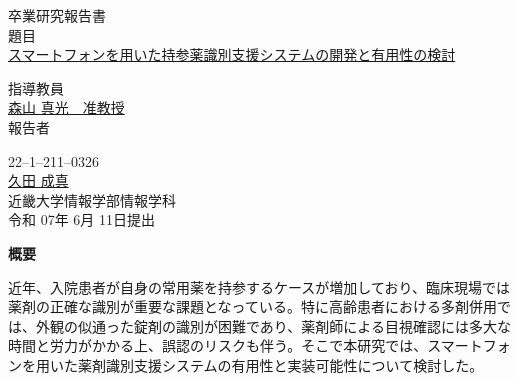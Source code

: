 \documentclass[12pt]{article}
\begin{document}
\pagestyle{empty}

\begin{center}
\vspace*{1cm}
\large
{\LARGE 卒業研究報告書}\\
\vspace*{0.8cm}
題目\\
\vspace*{1cm}
{\Huge \underline{スマートフォンを用いた持参薬識別支援システムの開発と有用性の検討}}\\
\vspace{3mm}

\vspace*{3cm}
指導教員\\
\vspace*{0.3cm}
\underline{\LARGE 森山 真光　准教授}\\
\vspace*{3cm}
報告者\\
\vspace*{0.3cm}

{22--1--211--0326}\\
\vspace*{0.3cm}
\underline{\Huge 久田 成真}\\
\vspace*{0.5cm}
近畿大学情報学部情報学科\\
\vspace*{2cm}
令和 07年 6月 11日提出\\
\end{center}

\newpage
\normalsize



\clearpage
\begin{center}
{\bf \Large 概要}
\end{center} 

近年、入院患者が自身の常用薬を持参するケースが増加しており、臨床現場では薬剤の正確な識別が重要な課題となっている。特に高齢患者における多剤併用では、外観の似通った錠剤の識別が困難であり、薬剤師による目視確認には多大な時間と労力がかかる上、誤認のリスクも伴う。そこで本研究では、スマートフォンを用いた薬剤識別支援システムの有用性と実装可能性について検討した。
\end{document}
